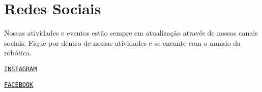 \section*{Redes Sociais}

Nossas atividades e eventos estão sempre em atualização através de nossos canais sociais. Fique por dentro de nossas atividades e se encante com o mundo da robótica.


\begin{DoxyItemize}
\item \href{https://www.instagram.com/pequimecanico/}{\tt I\+N\+S\+T\+A\+G\+R\+AM}
\item \href{https://www.facebook.com/NucleoPMec}{\tt F\+A\+C\+E\+B\+O\+OK} 
\end{DoxyItemize}